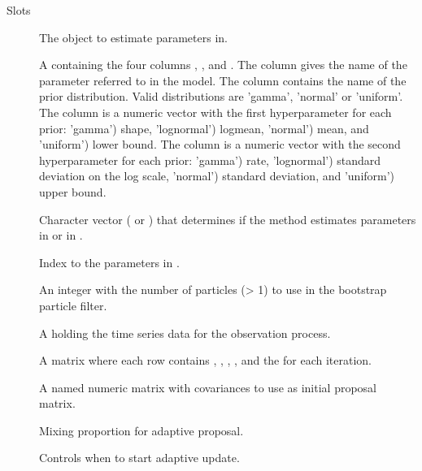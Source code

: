 \documentclass[letterpaper]{book}
\begin{document}
\begin{Section}{Slots}

\begin{description}

\item[] The  object to estimate parameters
in.

\item[] A  containing the four columns
, ,  and
. The column  gives the name of the
parameter referred to in the model. The column
 contains the name of the prior
distribution. Valid distributions are 'gamma', 'normal' or
'uniform'. The column  is a numeric vector with the
first hyperparameter for each prior: 'gamma') shape,
'lognormal') logmean, 'normal') mean, and 'uniform') lower
bound. The column  is a numeric vector with the
second hyperparameter for each prior: 'gamma') rate,
'lognormal') standard deviation on the log scale, 'normal')
standard deviation, and 'uniform') upper bound.

\item[] Character vector ( or ) that
determines if the  method estimates parameters in
 or in .

\item[] Index to the parameters in .

\item[] An integer with the number of particles (> 1) to
use in the bootstrap particle filter.

\item[] A  holding the time series data for
the observation process.

\item[] A matrix where each row contains ,
, , , and the
 for each iteration.

\item[] A named numeric  matrix with
covariances to use as initial proposal matrix.

\item[] Mixing proportion for adaptive proposal.

\item[] Controls when to start adaptive update.

\end{description}
\end{Section}
\end{document}
